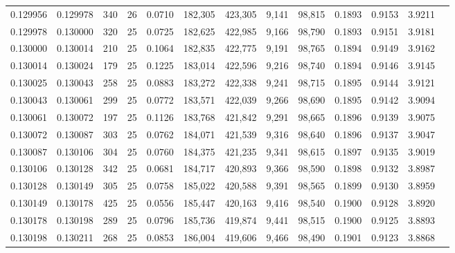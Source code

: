 \begin{tabular}{rrrrrrrrrrrrr}
0.129956 & 0.129978 &   340 &  26 &                                     0.0710 & 182,305 & 423,305 &   9,141 &  98,815 & 0.1893 & 0.9153 & 3.9211 \\
0.129978 & 0.130000 &   320 &  25 &                                     0.0725 & 182,625 & 422,985 &   9,166 &  98,790 & 0.1893 & 0.9151 & 3.9181 \\
0.130000 & 0.130014 &   210 &  25 &                                     0.1064 & 182,835 & 422,775 &   9,191 &  98,765 & 0.1894 & 0.9149 & 3.9162 \\
0.130014 & 0.130024 &   179 &  25 &                                     0.1225 & 183,014 & 422,596 &   9,216 &  98,740 & 0.1894 & 0.9146 & 3.9145 \\
0.130025 & 0.130043 &   258 &  25 &                                     0.0883 & 183,272 & 422,338 &   9,241 &  98,715 & 0.1895 & 0.9144 & 3.9121 \\
0.130043 & 0.130061 &   299 &  25 &                                     0.0772 & 183,571 & 422,039 &   9,266 &  98,690 & 0.1895 & 0.9142 & 3.9094 \\
0.130061 & 0.130072 &   197 &  25 &                                     0.1126 & 183,768 & 421,842 &   9,291 &  98,665 & 0.1896 & 0.9139 & 3.9075 \\
0.130072 & 0.130087 &   303 &  25 &                                     0.0762 & 184,071 & 421,539 &   9,316 &  98,640 & 0.1896 & 0.9137 & 3.9047 \\
0.130087 & 0.130106 &   304 &  25 &                                     0.0760 & 184,375 & 421,235 &   9,341 &  98,615 & 0.1897 & 0.9135 & 3.9019 \\
0.130106 & 0.130128 &   342 &  25 &                                     0.0681 & 184,717 & 420,893 &   9,366 &  98,590 & 0.1898 & 0.9132 & 3.8987 \\
0.130128 & 0.130149 &   305 &  25 &                                     0.0758 & 185,022 & 420,588 &   9,391 &  98,565 & 0.1899 & 0.9130 & 3.8959 \\
0.130149 & 0.130178 &   425 &  25 &                                     0.0556 & 185,447 & 420,163 &   9,416 &  98,540 & 0.1900 & 0.9128 & 3.8920 \\
0.130178 & 0.130198 &   289 &  25 &                                     0.0796 & 185,736 & 419,874 &   9,441 &  98,515 & 0.1900 & 0.9125 & 3.8893 \\
0.130198 & 0.130211 &   268 &  25 &                                     0.0853 & 186,004 & 419,606 &   9,466 &  98,490 & 0.1901 & 0.9123 & 3.8868 \\

\end{tabular}
